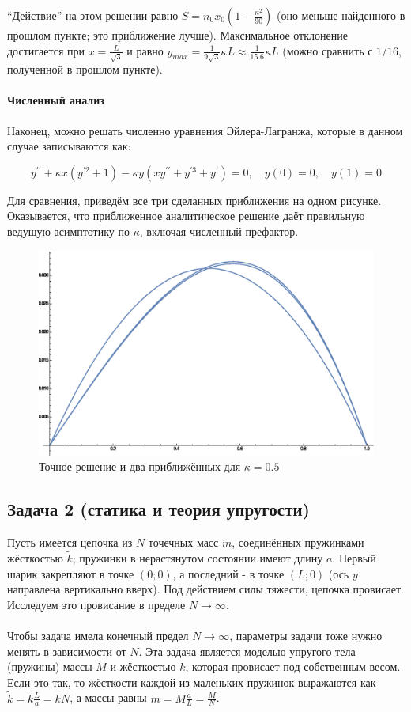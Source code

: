 \documentclass[a4paper,12pt]{article}
\begin{document}
\noindent
``Действие'' на этом решении равно $S=n_{0}x_{0}\left(1-\frac{\kappa^{2}}{90}\right)$
(оно меньше найденного в прошлом пункте; это приближение лучше). Максимальное
отклонение достигается при $x=\frac{L}{\sqrt{3}}$ и равно $y_{max}=\frac{1}{9\sqrt{3}}\kappa L\approx\frac{1}{15.6}\kappa L$
(можно сравнить с $1/16$, полученной в прошлом пункте).


\paragraph{Численный анализ}

Наконец, можно решать численно уравнения Эйлера-Лагранжа, которые
в данном случае записываются как:

\[
y^{\prime\prime}+\kappa x(y^{\prime2}+1)-\kappa y\left(xy^{\prime\prime}+y^{\prime3}+y^{\prime}\right)=0,
\quad y(0)=0,\quad y(1)=0
\]

\noindent
Для сравнения, приведём все три сделанных приближения на одном рисунке.
Оказывается, что приближенное аналитическое решение даёт правильную
ведущую асимптотику по $\kappa$, включая численный префактор.

\begin{figure}[h]
\caption{Точное решение и два приближённых для $\kappa=0.5$}
\centering
\includegraphics[width=0.5\columnwidth]{optics.eps}
\end{figure}



\subsection*{Задача 2 (статика и теория упругости)}

Пусть имеется цепочка из $N$ точечных масс $\tilde{m}$, соединённых
пружинками жёсткостью $\tilde{k}$; пружинки в нерастянутом состоянии
имеют длину $a$. Первый шарик закрепляют в точке $(0;0)$, а последний
- в точке $(L;0)$ (ось $y$ направлена вертикально вверх). Под действием
силы тяжести, цепочка провисает. Исследуем это провисание в пределе
$N\to\infty$.\\\\
Чтобы задача имела конечный предел $N\to\infty$, параметры задачи
тоже нужно менять в зависимости от $N$. Эта задача является моделью
упругого тела (пружины) массы $M$ и жёсткостью $k$, которая провисает
под собственным весом. Если это так, то жёсткости каждой из маленьких
пружинок выражаются как $\tilde{k}=k\frac{L}{a}=kN$, а массы равны
$\tilde{m}=M\frac{a}{L}=\frac{M}{N}$.
\end{document}

